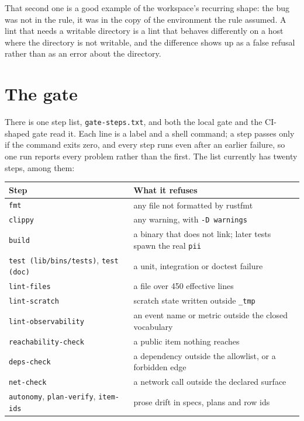 That second one is a good example of the workspace's recurring shape: the bug was not in the rule,
it was in the copy of the environment the rule assumed. A lint that needs a writable directory is a
lint that behaves differently on a host where the directory is not writable, and the difference
shows up as a false refusal rather than as an error about the directory.

\section{The gate}

There is one step list, \texttt{gate-steps.txt}, and both the local gate and the CI-shaped gate
read it. Each line is a label and a shell command; a step passes only if the command exits zero,
and every step runs even after an earlier failure, so one run reports every problem rather than the
first. The list currently has twenty steps, among them:

\begin{center}
\footnotesize
\begin{tabular}{@{}p{}p{}@{}}
	\toprule
	\textbf{Step} & \textbf{What it refuses} \\
	\midrule
	\texttt{fmt} & any file not formatted by rustfmt \\
	\texttt{clippy} & any warning, with \texttt{-D warnings} \\
	\texttt{build} & a binary that does not link; later tests spawn the real \texttt{pii} \\
	\texttt{test (lib/bins/tests)}, \texttt{test (doc)} & a unit, integration or doctest failure \\
	\texttt{lint-files} & a file over 450 effective lines \\
	\texttt{lint-scratch} & scratch state written outside \texttt{\_tmp} \\
	\texttt{lint-observability} & an event name or metric outside the closed vocabulary \\
	\texttt{reachability-check} & a public item nothing reaches \\
	\texttt{deps-check} & a dependency outside the allowlist, or a forbidden edge \\
	\texttt{net-check} & a network call outside the declared surface \\
	\texttt{autonomy}, \texttt{plan-verify}, \texttt{item-ids} & prose drift in specs, plans and
	row ids \\
	\bottomrule
\end{tabular}
\end{center}

